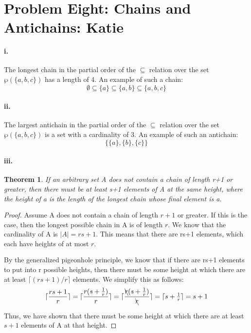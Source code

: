 \documentclass[10pt,letter]{article}
\newtheorem*{thm}{Theorem}
\begin{document}
\section*{Problem Eight: Chains and Antichains: Katie}

\paragraph{i.} The longest chain in the partial order of the $\subseteq$ relation over the set $\wp(\{a, b, c\})$ has a length of 4. An example of such a chain:
$$\emptyset \subseteq \{a\} \subseteq \{a, b\} \subseteq \{a, b, c\}$$

\paragraph{ii.} The largest antichain in the partial order of the $\subseteq$ relation over the set $\wp(\{a, b, c\})$ is a set with a cardinality of 3. An example of such an antichain:
$$\{\{a\}, \{b\}, \{c\}\}$$

\paragraph{iii.} 
\begin{thm} If an arbitrary set A does not contain a chain of length r+1 or greater, then there must be at least s+1 elements of A at the same height, where the height of a is the length of the longest chain whose final element is a. \end{thm}
\begin{proof} Assume A does not contain a chain of length $r+1$ or greater. If this is the case, then the longest possible chain in A is of length $r$. We know that the cardinality of A is $|A| = rs+1$. This means that there are rs+1 elements, which each have heights of at most $r$. 

By the generalized pigeonhole principle, we know that if there are rs+1 elements to put into r possible heights, then there must be some height at which there are at least $\lceil (rs+1)/r \rceil$ elements. We simplify this as follows:
$$\lceil \dfrac{rs+1}{r} \rceil = \lceil \dfrac{r(s+\tfrac{1}{r})}{r} \rceil = \lceil \dfrac{\bcancel{r}(s+\tfrac{1}{r})}{\bcancel{r}} \rceil  = \lceil s+\tfrac{1}{r} \rceil = s+1$$

Thus, we have shown that there must be some height at which there are at least $s+1$ elements of A at that height.
\end{proof}
\end{document}
